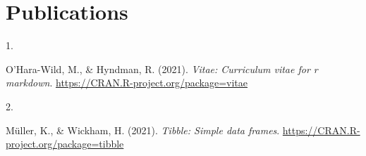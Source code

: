 \documentclass[11pt,a4paper,]{awesome-cv}
\newlength{\csllabelwidth}
\newcommand{\CSLLeftMargin}[1]{\parbox[t]{\csllabelwidth}{#1}}
\newcommand{\CSLRightInline}[1]{\parbox[t]{\linewidth - \csllabelwidth}{#1}}
\begin{document}
\begin{cvhonors}
\end{cvhonors}

\hypertarget{publications}{%
\section{Publications}\label{publications}}

\hypertarget{bibliography}{}
\leavevmode\hypertarget{ref-R-vitae}{}%
\CSLLeftMargin{1. }
\CSLRightInline{O'Hara-Wild, M., \& Hyndman, R. (2021). \emph{Vitae:
Curriculum vitae for r markdown}.
\url{https://CRAN.R-project.org/package=vitae}}

\leavevmode\hypertarget{ref-R-tibble}{}%
\CSLLeftMargin{2. }
\CSLRightInline{Müller, K., \& Wickham, H. (2021). \emph{Tibble: Simple
data frames}. \url{https://CRAN.R-project.org/package=tibble}}


\label{LastPage}~
\end{document}
